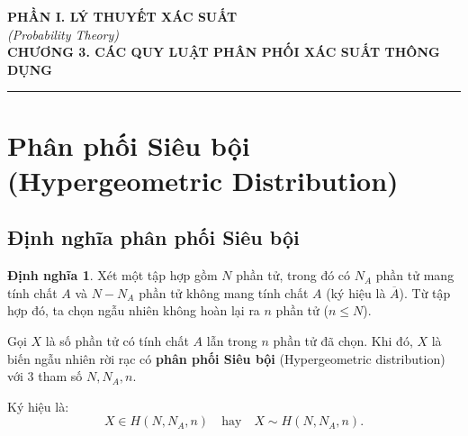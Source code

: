 \documentclass[12pt,a4paper]{article}
\theoremstyle{definition}
\newtheorem{dinhnghia}{Định nghĩa}[section]
\begin{document}
\begin{center}
    {\large \textbf{PHẦN I. LÝ THUYẾT XÁC SUẤT}}\\[0.3em]
    {\normalsize \textit{(Probability Theory)}}\\[1em]
    {\LARGE \textbf{CHƯƠNG 3. CÁC QUY LUẬT PHÂN PHỐI XÁC SUẤT THÔNG DỤNG}}
\end{center}

\vspace{1em}
\hrule
\vspace{1.5em}

\section{Phân phối Siêu bội (Hypergeometric Distribution)}

\subsection{Định nghĩa phân phối Siêu bội}

\begin{dinhnghia}
Xét một tập hợp gồm $N$ phần tử, trong đó có $N_A$ phần tử mang tính chất $A$ và $N - N_A$ phần tử không mang tính chất $A$ (ký hiệu là $\overline{A}$). Từ tập hợp đó, ta chọn ngẫu nhiên không hoàn lại ra $n$ phần tử ($n \le N$).

Gọi $X$ là số phần tử có tính chất $A$ lẫn trong $n$ phần tử đã chọn. Khi đó, $X$ là biến ngẫu nhiên rời rạc có \textbf{phân phối Siêu bội} (Hypergeometric distribution) với 3 tham số $N, N_A, n$.

Ký hiệu là:
\[
X \in H(N, N_A, n) \quad \text{hay} \quad X \sim H(N, N_A, n).
\]
\end{dinhnghia}

\begin{center}
\end{center}
\end{document}

